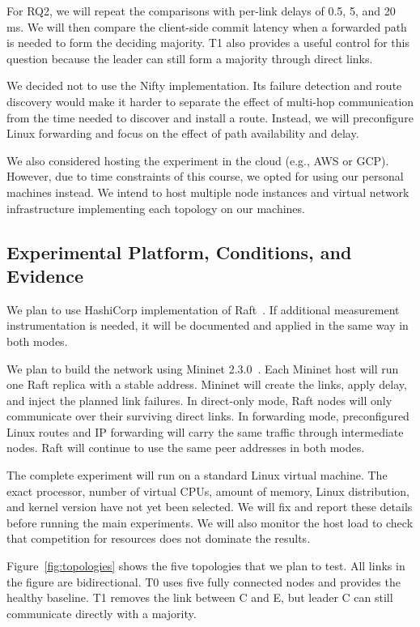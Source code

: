 \documentclass[11pt,a4paper]{article}
\begin{document}
For RQ2, we will repeat the comparisons with per-link delays of 0.5, 5, and 20\,ms. 
We will then compare the client-side commit latency when a forwarded path is needed to form the deciding majority. 
T1 also provides a useful control for this question because the leader can still form a majority through direct links.

We decided not to use the Nifty implementation. 
Its failure detection and route discovery would make it harder to separate the effect of multi-hop communication from the time needed to discover and install a route. 
Instead, we will preconfigure Linux forwarding and focus on the effect of path availability and delay.

We also considered hosting the experiment in the cloud (e.g., AWS or GCP). 
However, due to time constraints of this course, we opted for using our personal machines instead.
We intend to host multiple node instances and virtual network infrastructure implementing each topology on our machines.

\subsection{Experimental Platform, Conditions, and Evidence}

We plan to use HashiCorp implementation of Raft~\cite{hashicorp_raft}. 
If additional measurement instrumentation is needed, it will be documented and applied in the same way in both modes.

We plan to build the network using Mininet 2.3.0~\cite{lantz2010mininet,mininet230}. 
Each Mininet host will run one Raft replica with a stable address. 
Mininet will create the links, apply delay, and inject the planned link failures. 
In direct-only mode, Raft nodes will only communicate over their surviving direct links. 
In forwarding mode, preconfigured Linux routes and IP forwarding will carry the same traffic through intermediate nodes. 
Raft will continue to use the same peer addresses in both modes.

The complete experiment will run on a standard Linux virtual machine. 
The exact processor, number of virtual CPUs, amount of memory, Linux distribution, and kernel version have not yet been selected. 
We will fix and report these details before running the main experiments. 
We will also monitor the host load to check that competition for resources does not dominate the results.

Figure~\ref{fig:topologies} shows the five topologies that we plan to test. 
All links in the figure are bidirectional. 
T0 uses five fully connected nodes and provides the healthy baseline. 
T1 removes the link between C and E, but leader C can still communicate directly with a majority.
\end{document}
